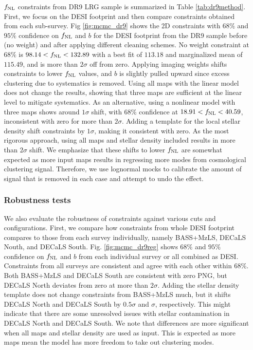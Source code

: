 $f_{\rm NL}$ constraints from DR9 LRG sample is summarized in Table \ref{tab:dr9method}. First, we focus on the DESI footprint and then compare constraints obtained from each sub-survey. Fig \ref{fig:mcmc_dr9} shows the 2D constraints with $68\%$ and $95\%$ confidence on $f_{\rm NL}$ and $b$ for the DESI footprint from the DR9 sample before (no weight) and after applying different cleaning schemes. No weight constraint at $68\%$ is $98.14<f_{\rm NL}<132.89$ with a best fit of $113.18$ and marginalized mean of $115.49$, and is more than $2\sigma$ off from zero. Applying imaging weights shifts constraints to lower $f_{\rm NL}$ values, and $b$ is slightly pulled upward since excess clustering due to systematics is removed. Using all maps with the linear model does not change the results, showing that three maps are sufficient at the linear level to mitigate systematics.  As an alternative, using a nonlinear model with three maps shows around $1\sigma$ shift, with $68\%$ confidence at $18.91<f_{\rm NL}<40.59$, inconsistent with zero for more than $2\sigma$. Adding a template for the local stellar density shift constraints by $1\sigma$, making it consistent with zero. As the most rigorous approach, using all maps and stellar density included results in more than $2\sigma$ shift. We emphasize that these shifts to lower $f_{\rm NL}$ are somewhat expected as more input maps results in regressing more modes from cosmological clustering signal. Therefore, we use lognormal mocks to calibrate the amount of signal that is removed in each case and attempt to undo the effect.


\subsubsection{Robustness tests}
We also evaluate the robustness of constraints against various cuts and configurations. First, we compare how constraints from whole DESI footprint compares to those from each survey individually, namely BASS+MzLS, DECaLS Nouth, and DECaLS South. Fig. \ref{fig:mcmc_dr9reg} shows $68\%$ and $95\%$ confidence on $f_{\rm NL}$ and $b$ from each individual survey or all combined as DESI. Constraints from all surveys are consistent and agree with each other within $68\%$. Both BASS+MzLS and DECaLS South are consistent with zero PNG, but DECaLS North deviates from zero at more than $2\sigma$. Adding the stellar density template does not change constraints from BASS+MzLS much, but it shifts DECaLS North and DECaLS South by $0.5\sigma$ and $\sigma$, respectively. This might indicate that there are some unresolved issues with stellar contamination in DECaLS North and DECaLS South. We note that differences are more significant when all maps and stellar density are used as input. This is expected as more maps mean the model has more freedom to take out clustering modes.
 
